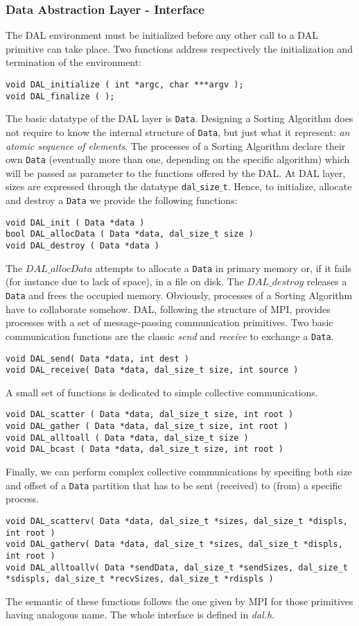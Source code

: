 \subsubsection{Data Abstraction Layer - Interface}
\label{DAL-int}
The DAL environment must be initialized before any other call to a DAL primitive can take place. Two functions address respectively the initialization and termination of the environment:
\begin{lstlisting}
void DAL_initialize ( int *argc, char ***argv );
void DAL_finalize ( );
\end{lstlisting}
The basic datatype of the DAL layer is \texttt{Data}. Designing a Sorting Algorithm does not require to know the internal structure of \texttt{Data}, but just what it represent: \textit{an atomic sequence of elements}. The processes of a Sorting Algorithm declare their own \texttt{Data} (eventually more than one, depending on the specific algorithm) which will be passed as parameter to the functions offered by the DAL. At DAL layer, sizes are expressed through the datatype \texttt{dal$\_$size$\_$t}. Hence, to initialize, allocate and destroy a \texttt{Data} we provide the following functions:
\begin{lstlisting}
void DAL_init ( Data *data )
bool DAL_allocData ( Data *data, dal_size_t size )
void DAL_destroy ( Data *data )
\end{lstlisting}
The $DAL\_allocData$ attempts to allocate a \texttt{Data} in primary memory or, if it fails (for instance due to lack of space), in a file on disk. The $DAL\_destroy$ releases a \texttt{Data} and frees the occupied memory. 
Obviously, processes of a Sorting Algorithm have to collaborate somehow. DAL, following the structure of MPI, provides processes with a set of message-passing communication primitives. Two basic communication functions are the classic \textit{send} and \textit{receive} to exchange a \texttt{Data}.
\begin{lstlisting}
void DAL_send( Data *data, int dest )
void DAL_receive( Data *data, dal_size_t size, int source )
\end{lstlisting}
A small set of functions is dedicated to simple collective communications.
\begin{lstlisting}
void DAL_scatter ( Data *data, dal_size_t size, int root )
void DAL_gather ( Data *data, dal_size_t size, int root )
void DAL_alltoall ( Data *data, dal_size_t size )
void DAL_bcast ( Data *data, dal_size_t size, int root )
\end{lstlisting}
Finally, we can perform complex collective communications by specifing both size and offset of a \texttt{Data} partition that has to be sent (received) to (from) a specific process. 
\begin{lstlisting}
void DAL_scatterv( Data *data, dal_size_t *sizes, dal_size_t *displs, int root )
void DAL_gatherv( Data *data, dal_size_t *sizes, dal_size_t *displs, int root )
void DAL_alltoallv( Data *sendData, dal_size_t *sendSizes, dal_size_t *sdispls, dal_size_t *recvSizes, dal_size_t *rdispls )
\end{lstlisting}
The semantic of these functions follows the one given by MPI for those primitives having analogous name. The whole interface is defined in \textit{dal.h}.

